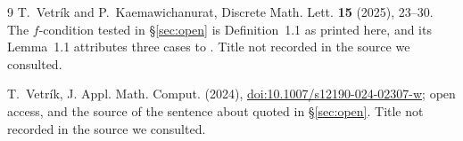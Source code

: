 \documentclass[11pt]{amsart}
\theoremstyle{remark}
\begin{document}
\begin{thebibliography}{9}
T.~Vetr\'ik and P.~Kaemawichanurat,
Discrete Math. Lett. \textbf{15} (2025), 23--30.
The $f$-condition tested in \S\ref{sec:open} is Definition~1.1 as printed
here, and its Lemma~1.1 attributes three cases to \cite{Vetrik}. Title not
recorded in the source we consulted.

T.~Vetr\'ik,
J. Appl. Math. Comput. (2024),
\href{https://doi.org/10.1007/s12190-024-02307-w}{doi:10.1007/s12190-024-02307-w};
open access, and the source of the sentence about \cite{Vetrik} quoted in
\S\ref{sec:open}. Title not recorded in the source we consulted.

\end{thebibliography}
\end{document}
